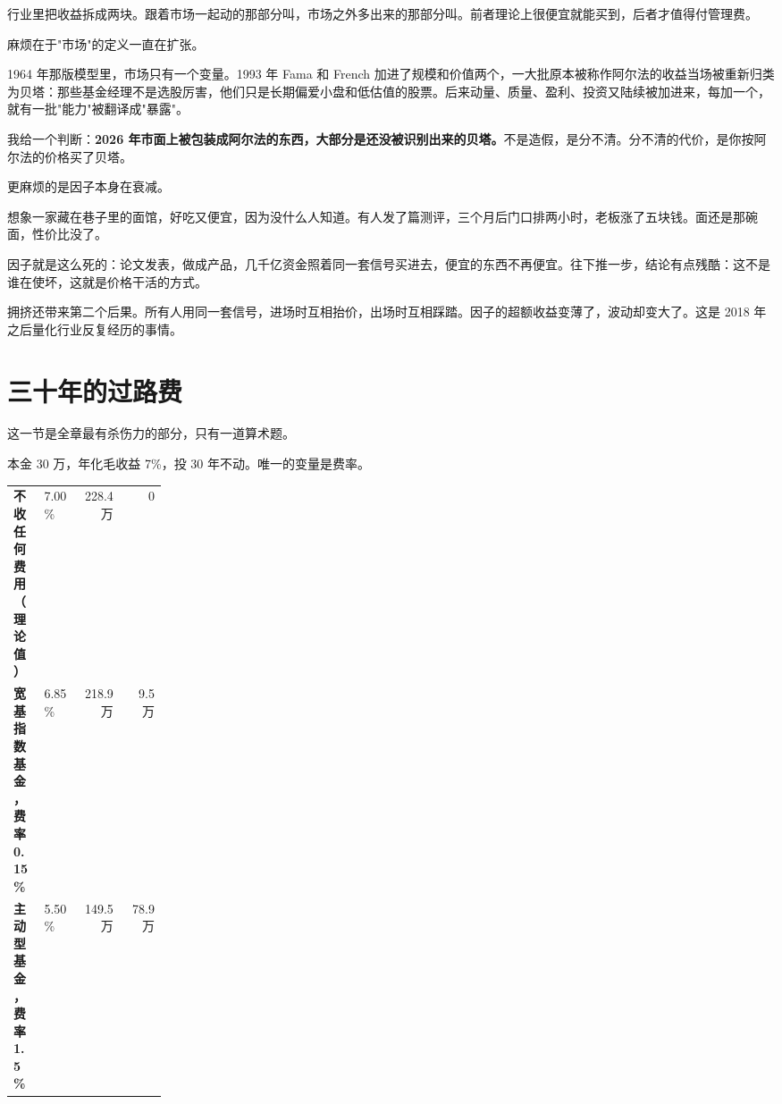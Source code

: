 行业里把收益拆成两块。跟着市场一起动的那部分叫，市场之外多出来的那部分叫。前者理论上很便宜就能买到，后者才值得付管理费。

麻烦在于"市场"的定义一直在扩张。

1964 年那版模型里，市场只有一个变量。1993 年 Fama 和 French 加进了规模和价值两个，一大批原本被称作阿尔法的收益当场被重新归类为贝塔：那些基金经理不是选股厉害，他们只是长期偏爱小盘和低估值的股票。后来动量、质量、盈利、投资又陆续被加进来，每加一个，就有一批"能力"被翻译成"暴露"。

我给一个判断：\textbf{2026 年市面上被包装成阿尔法的东西，大部分是还没被识别出来的贝塔。}不是造假，是分不清。分不清的代价，是你按阿尔法的价格买了贝塔。

更麻烦的是因子本身在衰减。

想象一家藏在巷子里的面馆，好吃又便宜，因为没什么人知道。有人发了篇测评，三个月后门口排两小时，老板涨了五块钱。面还是那碗面，性价比没了。

因子就是这么死的：论文发表，做成产品，几千亿资金照着同一套信号买进去，便宜的东西不再便宜。往下推一步，结论有点残酷：这不是谁在使坏，这就是价格干活的方式。

拥挤还带来第二个后果。所有人用同一套信号，进场时互相抬价，出场时互相踩踏。因子的超额收益变薄了，波动却变大了。这是 2018 年之后量化行业反复经历的事情。

\section{三十年的过路费}

这一节是全章最有杀伤力的部分，只有一道算术题。

本金 30 万，年化毛收益 7\%，投 30 年不动。唯一的变量是费率。

\begin{tablewrap}
\begin{xltabular}{\linewidth}{>{\raggedright\arraybackslash}p{0.20\linewidth}Xrr}
\toprule
{} &  &  &  \\
\midrule
\textbf{不收任何费用（理论值）} & 7.00\% & 228.4 万 & 0 \\
\textbf{宽基指数基金，费率 0.15\%} & 6.85\% & 218.9 万 & 9.5 万 \\
\textbf{主动型基金，费率 1.5\%} & 5.50\% & 149.5 万 & 78.9 万 \\
\bottomrule
\end{xltabular}
\end{tablewrap}

